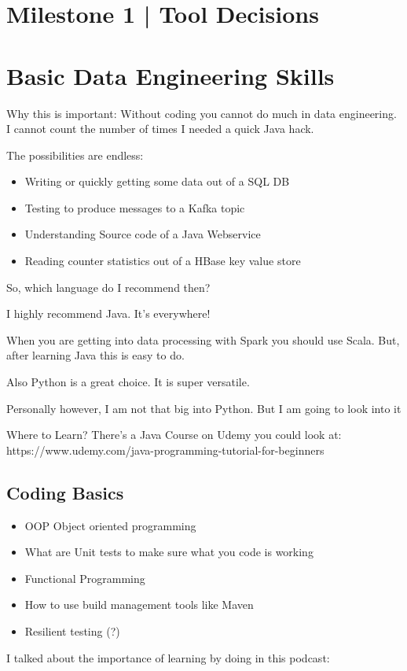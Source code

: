 \documentclass[12pt]{scrartcl} %
\begin{document}
\section{Milestone 1 | Tool Decisions} 
 
 
 
\section{Basic Data Engineering Skills}

Why this is important: Without coding you cannot do much in data engineering. I cannot count the number of times I needed a quick Java hack.

The possibilities are endless:

\begin{itemize}
\item Writing or quickly getting some data out of a SQL DB
\item Testing to produce messages to a Kafka topic
\item Understanding Source code of a Java Webservice
\item Reading counter statistics out of a HBase key value store
\end{itemize}
So, which language do I recommend then?

I highly recommend Java. It’s everywhere!

When you are getting into data processing with Spark you should use Scala. But, after learning Java this is easy to do.

Also Python is a great choice. It is super versatile.

Personally however, I am not that big into Python. But I am going to look into it

Where to Learn?
There’s a Java Course on Udemy you could look at: https://www.udemy.com/java-programming-tutorial-for-beginners

\subsection{Coding Basics}
\begin{itemize}
\item OOP Object oriented programming
\item What are Unit tests to make sure what you code is working
\item Functional Programming
\item How to use build management tools like Maven
\item Resilient testing (?)
\end{itemize}
I talked about the importance of learning by doing in this podcast:
\end{document}
